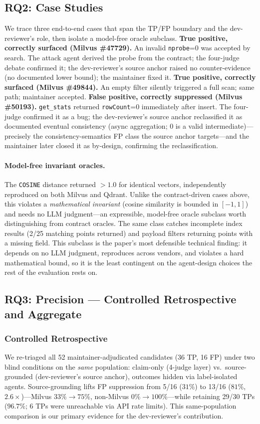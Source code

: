 \documentclass[sigconf]{acmart}
\begin{document}
\subsection{RQ2: Case Studies}
We trace three end-to-end cases that span the TP/FP boundary and the dev-reviewer's role, then isolate a model-free oracle subclass.
\textbf{True positive, correctly surfaced (Milvus \#47729).} An invalid \texttt{nprobe}=0 was accepted by search. The attack agent derived the probe from the contract; the four-judge debate confirmed it; the dev-reviewer's source anchor raised no counter-evidence (no documented lower bound); the maintainer fixed it.
\textbf{True positive, correctly surfaced (Milvus \#49844).} An empty filter silently triggered a full scan; same path; maintainer accepted.
\textbf{False positive, correctly suppressed (Milvus \#50193).} \texttt{get\_stats} returned \texttt{rowCount}=0 immediately after insert. The four-judge confirmed it as a bug; the dev-reviewer's source anchor reclassified it as documented eventual consistency (async aggregation; 0 is a valid intermediate)---precisely the consistency-semantics FP class the source anchor targets---and the maintainer later closed it as by-design, confirming the reclassification.
\paragraph{Model-free invariant oracles.} The \texttt{COSINE} distance returned $>1.0$ for identical vectors, independently reproduced on both Milvus and Qdrant. Unlike the contract-driven cases above, this violates a \emph{mathematical invariant} (cosine similarity is bounded in $[-1,1]$) and needs no LLM judgment---an expressible, model-free oracle subclass worth distinguishing from contract oracles. The same class catches incomplete index results (2/25 matching points returned) and payload filters returning points with a missing field. This subclass is the paper's most defensible technical finding: it depends on no LLM judgment, reproduces across vendors, and violates a hard mathematical bound, so it is the least contingent on the agent-design choices the rest of the evaluation rests on.

\subsection{RQ3: Precision --- Controlled Retrospective and Aggregate}\label{sec:eval-rq3}

\subsubsection{Controlled Retrospective}
We re-triaged all 52 maintainer-adjudicated candidates (36 TP, 16 FP) under two blind conditions on the \emph{same} population: claim-only (4-judge layer) vs.\ source-grounded (dev-reviewer's source anchor), outcomes hidden via label-isolated agents. Source-grounding lifts FP suppression from 5/16 ($31\%$) to 13/16 ($81\%$, $2.6\times$)---Milvus $33\%{\to}75\%$, non-Milvus $0\%{\to}100\%$---while retaining 29/30 TPs ($96.7\%$; 6 TPs were unreachable via API rate limits). This same-population comparison is our primary evidence for the dev-reviewer's contribution.
\end{document}
